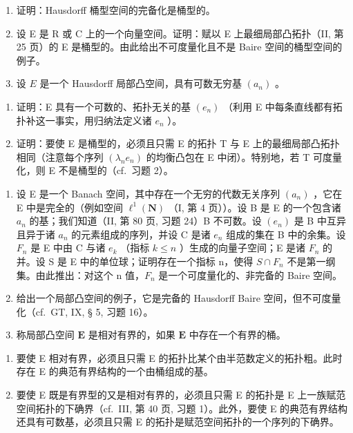 \exercisegroup

\begin{enumerate}
\def\labelenumi{\arabic{enumi})}
\item
  证明：Hausdorff 桶型空间的完备化是桶型的。
\item
  设 E 是 R 或 C 上的一个向量空间。证明：赋以 E 上最细局部凸拓扑（II, 第 25 页）的 E 是桶型的。由此给出不可度量化且不是 Baire 空间的桶型空间的例子。
\item
  设 \(E\) 是一个 Hausdorff 局部凸空间，具有可数无穷基 \((a_{n})\) 。
\end{enumerate}

\begin{enumerate}
\def\labelenumi{\alph{enumi})}
\item
  证明：E 具有一个可数的、拓扑无关的基 \((e_n)\) （利用 E 中每条直线都有拓扑补这一事实，用归纳法定义诸 \(e_n\) ）。
\item
  证明：要使 E 是桶型的，必须且只需 E 的拓扑 T 与 E 上的最细局部凸拓扑相同（注意每个序列 \((\lambda_{n}e_{n})\) 的均衡凸包在 E 中闭）。特别地，若 T 可度量化，则 E 不是桶型的（cf.~习题 2）。
\end{enumerate}

\begin{enumerate}
\def\labelenumi{\arabic{enumi})}
\setcounter{enumi}{3}
\item
  设 E 是一个 Banach 空间，其中存在一个无穷的代数无关序列 \((a_{n})\) ，它在 E 中是完全的（例如空间 \(\ell^{1}(\mathbf{N})\) （I, 第 4 页））。设 B 是 E 的一个包含诸 \(a_{n}\) 的基；我们知道（II, 第 80 页, 习题 24）B 不可数。设 \((e_{n})\) 是 B 中互异且异于诸 \(a_{n}\) 的元素组成的序列，并设 C 是诸 \(e_{n}\) 组成的集在 B 中的余集。设 \(F_{n}\) 是 E 中由 C 与诸 \(e_{k}\) （指标 \(k \leqslant n\) ）生成的向量子空间；E 是诸 \(F_{n}\) 的并。设 S 是 E 中的单位球；证明存在一个指标 n，使得 \(S \cap F_{n}\) 不是第一纲集。由此推出：对这个 n 值，\(F_{n}\) 是一个可度量化的、非完备的 Baire 空间。
\item
  给出一个局部凸空间的例子，它是完备的 Hausdorff Baire 空间，但不可度量化（cf.~GT, IX, § 5, 习题 16）。
\item
  称局部凸空间 \(\mathbf{E}\) 是相对有界的，如果 \(\mathbf{E}\) 中存在一个有界的桶。
\end{enumerate}

\begin{enumerate}
\def\labelenumi{\alph{enumi})}
\item
  要使 E 相对有界，必须且只需 E 的拓扑比某个由半范数定义的拓扑粗。此时存在 E 的典范有界结构的一个由桶组成的基。
\item
  要使 E 既是有界型的又是相对有界的，必须且只需 E 的拓扑是 E 上一族赋范空间拓扑的下确界（cf.~III, 第 40 页, 习题 1）。此外，要使 E 的典范有界结构还具有可数基，必须且只需 E 的拓扑是赋范空间拓扑的一个序列的下确界。
\end{enumerate}

